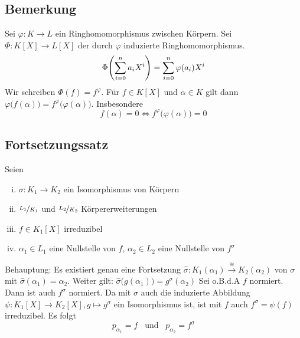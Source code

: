 \subsection[{Bemerkung: $\varphi :K \to L$ induziert Ringhomomorphismus $\Phi :L[X] \to L[X]$}]{Bemerkung} %
\label{sub:148}
Sei $\varphi : K \to L$ ein Ringhomomorphismus zwischen Körpern. Sei $\Phi : K[X] \to L[X]$ der durch $\varphi$ induzierte Ringhomomorphismus.
\[
	\Phi \enbrace*{\sum_{i=0}^{n} a_i X^i} = \sum_{i=0}^{n} \varphi(a_i) X^i 
\]
Wir schreiben $\Phi (f) = f^\varphi$. Für $f \in K[X]$ und $\alpha \in K$ gilt dann $\varphi\big(f(\alpha)\big) = f^\varphi \big(\varphi(\alpha)\big)$. Insbesondere
\[
	f(\alpha) =0 \iff f^\varphi \big(\varphi(\alpha)\big)=0
\]

\subsection{Fortsetzungssatz} %
\label{sub:149}
\begin{wrapfigure}[6]{R}{4cm}
\end{wrapfigure}
Seien
\begin{enumerate}[(i)]
	\item $\sigma : K_1 \to K_2$ ein Isomorphismus von Körpern
	\item $\nicefrac{L_1}{K_1}$ und $\nicefrac{L_2}{K_2}$ Körpererweiterungen
	\item $f \in K_1[X]$ irreduzibel
	\item $\alpha_1 \in L_1$ eine Nullstelle von $f$, $\alpha_2 \in L_2$ eine Nullstelle von $f^\sigma$
\end{enumerate}
Behauptung: Es existiert genau eine Fortsetzung $\hat \sigma: K_1(\alpha_1) \xrightarrow{\cong} K_2(\alpha_2) $ von $\sigma$ mit $\hat \sigma(\alpha_1)= \alpha_2$. Weiter
gilt: $\hat \sigma \big(g(\alpha_1)\big) = g^\sigma(\alpha_2)$
Sei o.B.d.A $f$ normiert. Dann ist auch $f^\sigma$ normiert. Da mit $\sigma$ auch die induzierte Abbildung $\psi : K_1[X] \to K_2[X], g \mapsto g^\sigma$ ein Isomorphismus
ist, ist mit $f$ auch $f^\sigma = \psi(f)$ irreduzibel. Es folgt 
\[
	p_{\alpha_1} = f \enspace \text{ und } \enspace p_{\alpha_2}= f^\sigma 
\]
